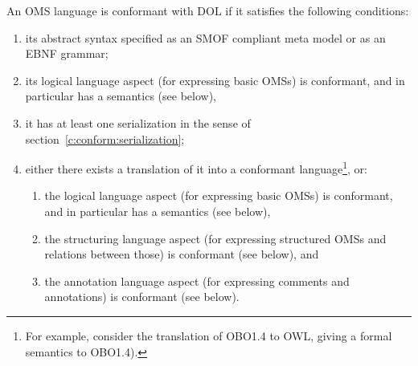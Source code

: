 \documentclass[10pt,%
\ifpretendfinal
final%
\else
draft%
\fi,
]{scrreprt}
\makeatletter
\newcommand*\CommentAuthor{}
\renewcommand*\CommentAuthor{#1}}
\newcommand*\CommentDate{}
\renewcommand*\CommentDate{#1}}
\newcommand*\CommentId{}
\renewcommand*\CommentId{#1}}
\newcommand*\CommentType{}
\renewcommand*\CommentType{#1}}
\newcommand*{\SetCommentColorByType}[1]{%
\edef\localType{{#1}}%
\expandafter\ifstrequal\localType{q-aut}{\colorlet{CommentColor}{red}}{%
\expandafter\ifstrequal\localType{q-all}{\colorlet{CommentColor}{orange}}{%
\expandafter\ifstrequal\localType{todo}{\colorlet{CommentColor}{orange}}{%
\expandafter\ifstrequal\localType{fyi}{\colorlet{CommentColor}{lightgray}}{%
\colorlet{CommentColor}{yellow}}}}}}
\newcommand*{\SetCommentPrefixByType}[1]{%
\edef\localType{{#1}}%
\expandafter\@ifmtarg\localType{%
\edef\CommentPrefix{}%
}{%
\caseupper[q]{#1}%
\edef\CommentPrefix{\thestring: }%
}}
\newcommand*{\initComment}[1]{%
\setkeys{Comment}{#1}%
\SetCommentColorByType{\CommentType}%
\relax%
\SetCommentPrefixByType{\CommentType}%
\relax%
}
\newcommand*{\todonote}[2][]{%
\initComment{#1}%
\pdfcomment[author=\CommentAuthor,color=CommentColor,date=\CommentDate,id=\CommentId]{%
\CommentPrefix
#2}}
\renewcommand*{\todonote}[2][]{%
\initComment{#1}%
\ednote{\CommentPrefix #2}}
\makeatother
\begin{document}
%
%

An OMS language is conformant with DOL if it satisfies the following conditions:
\begin{enumerate}
\item its abstract syntax specified as an SMOF compliant meta model
or as an EBNF grammar;
\item its logical language aspect (for expressing basic OMSs) is conformant,
 and in particular has a semantics (see below),
\item it has at least one serialization in the sense of section~\ref{c:conform:serialization};
\item either there exists a translation of it into a conformant
  language\footnote {For example, consider the translation of OBO1.4
    to OWL, giving a formal semantics to OBO1.4).}, or:
\begin{enumerate}
\item the logical language aspect (for expressing basic OMSs) is conformant, and in particular has a semantics (see below),
\item  the
structuring language aspect (for expressing structured OMSs and relations
between those) is conformant (see below), and
\item the annotation language aspect (for expressing comments and annotations)
is conformant (see below).
\end{enumerate}
\end{enumerate}
\end{document}
